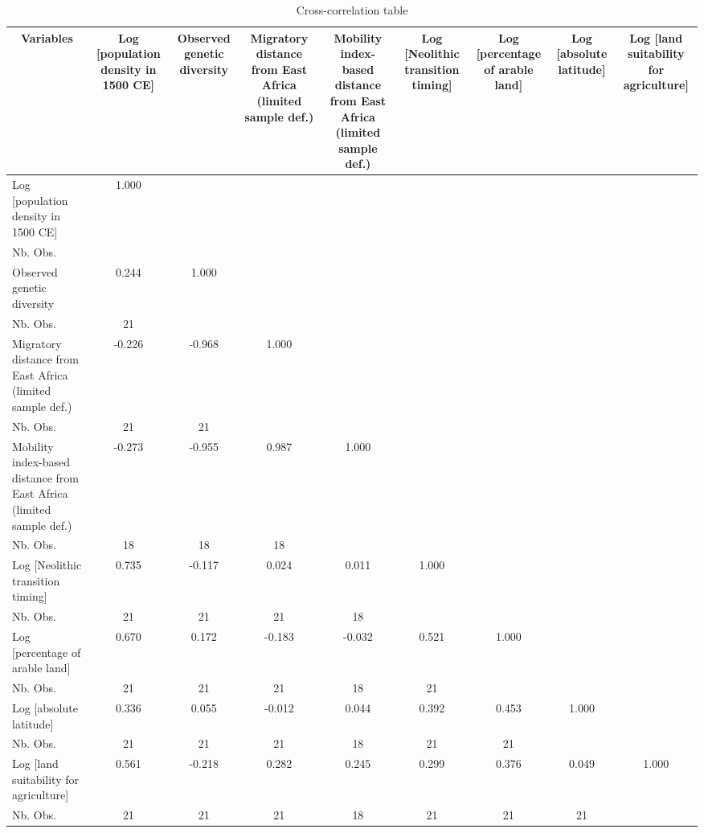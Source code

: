 \begin{table}[htbp]\centering \caption{Cross-correlation table\label{corrtable}}
\begin{tabular}{l  c  c  c  c  c  c  c  c }\hline\hline
\multicolumn{1}{c}{Variables} &Log [population density in 1500 CE]&Observed genetic diversity&Migratory distance from East Africa (limited sample def.)&Mobility index-based distance from East Africa (limited sample def.)&Log [Neolithic transition timing]&Log [percentage of arable land]&Log [absolute latitude]&Log [land suitability for agriculture]\\ \hline
Log [population density in 1500 CE]&1.000\\
Nb. Obs. &\\
Observed genetic diversity&0.244&1.000\\
Nb. Obs.&   21 &\\
Migratory distance from East Africa (limited sample def.)&-0.226&-0.968&1.000\\
Nb. Obs.&   21&   21 &\\
Mobility index-based distance from East Africa (limited sample def.)&-0.273&-0.955&0.987&1.000\\
Nb. Obs.&   18&   18&   18 &\\
Log [Neolithic transition timing]&0.735&-0.117&0.024&0.011&1.000\\
Nb. Obs.&   21&   21&   21&   18 &\\
Log [percentage of arable land]&0.670&0.172&-0.183&-0.032&0.521&1.000\\
Nb. Obs.&   21&   21&   21&   18&   21 &\\
Log [absolute latitude]&0.336&0.055&-0.012&0.044&0.392&0.453&1.000\\
Nb. Obs.&   21&   21&   21&   18&   21&   21 &\\
Log [land suitability for agriculture]&0.561&-0.218&0.282&0.245&0.299&0.376&0.049&1.000\\
Nb. Obs.&   21&   21&   21&   18&   21&   21&   21\\
\hline \hline 
 \end{tabular}
\end{table}

